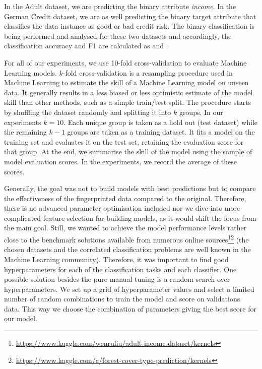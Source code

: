 In the Adult dataset, we are predicting the binary attribute \textit{income}. In the German Credit dataset, we are as well predicting the binary target attribute that classifies the data instance as good or bad credit risk. The binary classification is being performed and analysed for these two datasets and accordingly, the classification accuracy and F1 are calculated as  and .

For all of our experiments, we use 10-fold cross-validation to evaluate Machine Learning models.
$k$-fold cross-validation is a resampling procedure used in Machine Learning to estimate the skill of a Machine Learning model on unseen data.
It generally results in a less biased or less optimistic estimate of the model skill than other methods, such as a simple train/test split. 
The procedure starts by shuffling the dataset randomly and splitting it into $k$ groups. In our experiments $k=10$. 
Each unique group is taken as a hold out (test dataset) while the remaining $k-1$ groups are taken as a training dataset.
It fits a model on the training set and evaluates it on the test set, retaining the evaluation score for that group.
At the end, we summarise the skill of the model using the sample of model evaluation scores.
In the experiments, we record the average of these scores. 

Generally, the goal was not to build models with best predictions but to compare the effectiveness of the fingerprinted data compared to the original.
Therefore, there is no advanced parameter optimisation included nor we dive into more complicated feature selection for building models, as it would shift the focus from the main goal. 
Still, we wanted to achieve the model performance levels rather close to the benchmark solutions available from numerous online sources\footnote{\url{https://www.kaggle.com/wenruliu/adult-income-dataset/kernels}}\footnote{\url{https://www.kaggle.com/c/forest-cover-type-prediction/kernels}} (the chosen datasets and the correlated classification problems are well known in the Machine Learning community).
Therefore, it was important to find good hyperparameters for each of the classification tasks and each classifier.
One possible solution besides the pure manual tuning is a random search over hyperparameters.
We set up a grid of hyperparameter values and select a limited number of random combinations to train the model and score on validations data.
This way we choose the combination of parameters giving the best score for our model.

